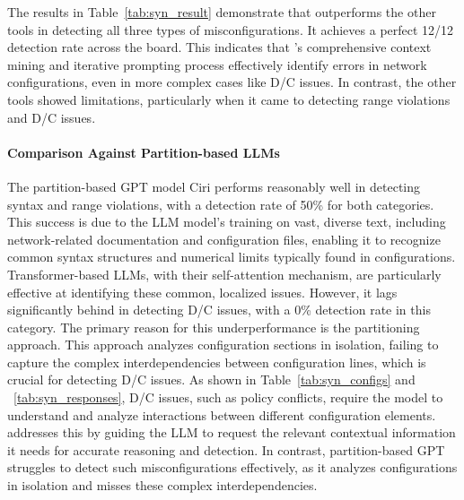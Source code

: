The results in Table~\ref{tab:syn_result} demonstrate that \sysname{} outperforms the other tools in detecting all three types of misconfigurations. It achieves a perfect 12/12 detection rate across the board. This indicates that \sysname{}'s comprehensive context mining and iterative prompting process effectively identify errors in network configurations, even in more complex cases like D/C issues. In contrast, the other tools showed limitations, particularly when it came to detecting range violations and D/C issues.


\paragraph{Comparison Against Partition-based LLMs} The partition-based GPT model Ciri performs reasonably well in detecting syntax and range violations, with a detection rate of 50\% for both categories.
This success is due to the LLM model's training on vast, diverse text, including network-related documentation and configuration files, enabling it to recognize common syntax structures and numerical limits typically found in configurations. Transformer-based LLMs, with their self-attention mechanism, are particularly effective at identifying these common, localized issues.
However, it lags significantly behind \sysname{} in detecting D/C issues, with a 0\% detection rate in this category. The primary reason for this underperformance is the partitioning approach. This approach analyzes configuration sections in isolation, failing to capture the complex interdependencies between configuration lines, which is crucial for detecting D/C issues. 
As shown in Table~\ref{tab:syn_configs} and ~\ref{tab:syn_responses}, D/C issues, such as policy conflicts, require the model to understand and analyze interactions between different configuration elements. \sysname{} addresses this by guiding the LLM to request the relevant contextual information it needs for accurate reasoning and detection. In contrast, partition-based GPT struggles to detect such misconfigurations effectively, as it analyzes configurations in isolation and misses these complex interdependencies.

